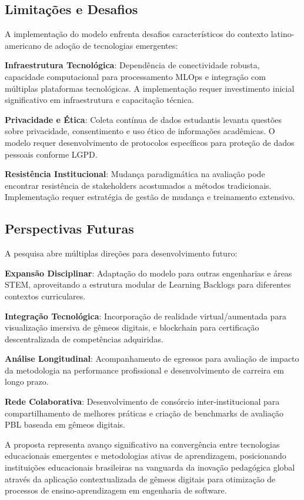 \documentclass[english, spanish, brazilian]{RBIEarticle} %
\begin{document}
\subsection{Limitações e Desafios}

A implementação do modelo enfrenta desafios característicos do contexto
latino-americano de adoção de tecnologias emergentes:

\textbf{Infraestrutura Tecnológica}: Dependência de conectividade robusta, capacidade computacional para processamento MLOps e integração com múltiplas plataformas tecnológicas. A implementação requer investimento inicial significativo em infraestrutura e capacitação técnica.

\textbf{Privacidade e Ética}: Coleta contínua de dados estudantis levanta questões sobre privacidade, consentimento e uso ético de informações acadêmicas. O modelo requer desenvolvimento de protocolos específicos para proteção de dados pessoais conforme LGPD.

\textbf{Resistência Institucional}: Mudança paradigmática na avaliação pode encontrar resistência de stakeholders acostumados a métodos tradicionais. Implementação requer estratégia de gestão de mudança e treinamento extensivo.

\subsection{Perspectivas Futuras}

A pesquisa abre múltiplas direções para desenvolvimento futuro:

\textbf{Expansão Disciplinar}: Adaptação do modelo para outras engenharias e áreas STEM, aproveitando a estrutura modular de Learning Backlogs para diferentes contextos curriculares.

\textbf{Integração Tecnológica}: Incorporação de realidade virtual/aumentada para visualização imersiva de gêmeos digitais, e blockchain para certificação descentralizada de competências adquiridas.

\textbf{Análise Longitudinal}: Acompanhamento de egressos para avaliação de impacto da metodologia na performance profissional e desenvolvimento de carreira em longo prazo.

\textbf{Rede Colaborativa}: Desenvolvimento de consórcio inter-institucional para compartilhamento de melhores práticas e criação de benchmarks de avaliação PBL baseada em gêmeos digitais.

A proposta representa avanço significativo na convergência entre tecnologias
educacionais emergentes e metodologias ativas de aprendizagem, posicionando
instituições educacionais brasileiras na vanguarda da inovação pedagógica
global através da aplicação contextualizada de gêmeos digitais para otimização
de processos de ensino-aprendizagem em engenharia de software.
\end{document}
